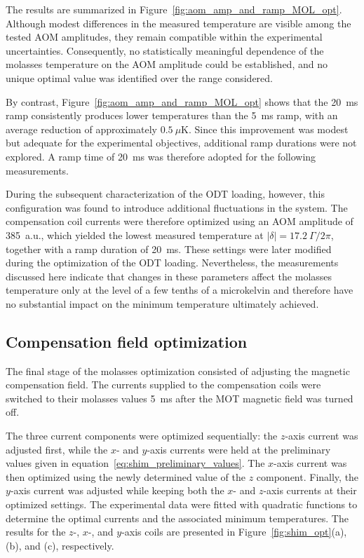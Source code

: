 The results are summarized in Figure~\ref{fig:aom_amp_and_ramp_MOL_opt}. Although modest differences in the measured temperature are visible among the tested AOM amplitudes, they remain compatible within the experimental uncertainties. Consequently, no statistically meaningful dependence of the molasses temperature on the AOM amplitude could be established, and no unique optimal value was identified over the range considered.

By contrast, Figure~\ref{fig:aom_amp_and_ramp_MOL_opt} shows that the 20~ms ramp consistently produces lower temperatures than the 5~ms ramp, with an average reduction of approximately $0.5~\mu\mathrm{K}$. Since this improvement was modest but adequate for the experimental objectives, additional ramp durations were not explored. A ramp time of 20~ms was therefore adopted for the following measurements.

During the subsequent characterization of the ODT loading, however, this configuration was found to introduce additional fluctuations in the system. The compensation coil currents were therefore optimized using an AOM amplitude of 385~a.u., which yielded the lowest measured temperature at $|\delta|=17.2~\Gamma/2\pi$, together with a ramp duration of 20~ms. These settings were later modified during the optimization of the ODT loading. Nevertheless, the measurements discussed here indicate that changes in these parameters affect the molasses temperature only at the level of a few tenths of a microkelvin and therefore have no substantial impact on the minimum temperature ultimately achieved.

\subsection{Compensation field optimization}
The final stage of the molasses optimization consisted of adjusting the magnetic compensation field. The currents supplied to the compensation coils were switched to their molasses values 5~ms after the MOT magnetic field was turned off.

The three current components were optimized sequentially: the $z$-axis current was adjusted first, while the $x$- and $y$-axis currents were held at the preliminary values given in equation~\eqref{eq:shim_preliminary_values}. The $x$-axis current was then optimized using the newly determined value of the $z$ component. Finally, the $y$-axis current was adjusted while keeping both the $x$- and $z$-axis currents at their optimized settings. The experimental data were fitted with quadratic functions to determine the optimal currents and the associated minimum temperatures. The results for the $z$-, $x$-, and $y$-axis coils are presented in Figure~\ref{fig:shim_opt}(a), (b), and (c), respectively.

